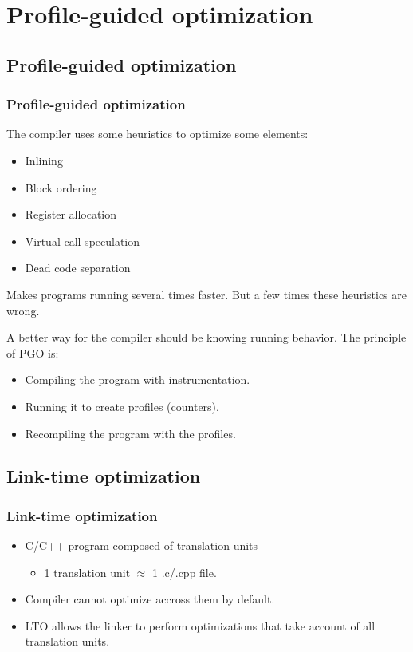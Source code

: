 \documentclass{beamer}
\begin{document}
\section{Profile-guided optimization}

\begin{frame}
    \tableofcontents[currentsection]
\end{frame}

\subsection{Profile-guided optimization}

\begin{frame}
    \frametitle{Profile-guided optimization}

    The compiler uses some heuristics to optimize some elements:
    \begin{itemize}
        \item Inlining
        \item Block ordering
        \item Register allocation
        \item Virtual call speculation
        \item Dead code separation
    \end{itemize}
    Makes programs running several times faster.
    But a few times these heuristics are wrong.
\end{frame}


\begin{frame}
    A better way for the compiler should be knowing running behavior.
    The principle of PGO is:
    \begin{itemize}
        \item Compiling the program with instrumentation.
        \item Running it to create profiles (counters).
        \item Recompiling the program with the profiles.
    \end{itemize}
\end{frame}
\subsection{Link-time optimization}

\begin{frame}
    \frametitle{Link-time optimization}

    \begin{itemize}
        \item C/C++ program composed of translation units
              \begin{itemize}
                  \item 1 translation unit $ \approx $ 1 .c/.cpp file.
              \end{itemize}
        \item Compiler cannot optimize accross them by default.
        \item LTO allows the linker to perform optimizations that take account of all translation units.
    \end{itemize}
\end{frame}
\end{document}
